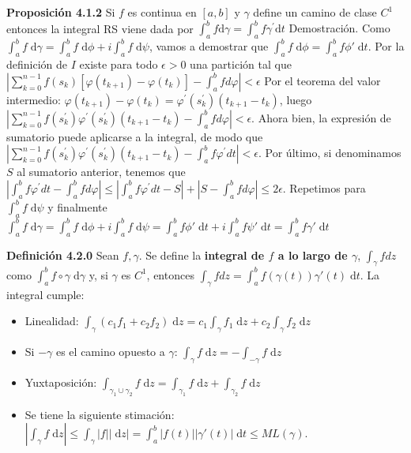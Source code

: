 \documentclass[a4paper, 11pt]{extarticle}
\newcommand{\propo}[1]{\textcolor{rojo}{\textbf{Proposición #1}}}
\newcommand{\defi}[1]{\textcolor{azul}{\textbf{Definición #1}}}
\newcommand{\dem}[1]{\textcolor{gris}{\small{Demostración. #1}}}
\begin{document}
\begin{multicols*}{2}
\propo{4.1.2} Si \(f\) es continua en \([a, b]\) y \(\gamma\) define un
camino de clase \(C^1\) entonces la integral RS viene dada por 
\(\int_{a}^{b} f \text{d} \gamma=\int_{a}^{b} f \gamma^{\prime} \text{d} t\)
\dem{ Como \( \int_ { a }^{ b } f \;
 \text{d}\gamma 
 = \int_ { a }^{ b } f \; \text{d}\phi + i \int_ { a }^{ b } f \; \text{d}\psi   \), vamos a demostrar que 
\( \int_ { a }^{ b } f \; \text{d}\phi = \int_ { a }^{ b } f \phi'\; \text{d}t \).
Por la definición de \( I \) existe para todo \( \epsilon > 0 \) una partición tal que \( 
 \left|\sum_{k=0}^{n-1} f\left(s_{k}\right)\left[\varphi\left(t_{k+1}\right)-\varphi\left(t_{k}\right)\right]-\int_{a}^{b} f d \varphi\right|<\epsilon \) 
Por el teorema del valor intermedio: \( \varphi\left(t_{k+1}\right)-\varphi\left(t_{k}\right)=\varphi^{\prime}\left(s_{k}^{\prime}\right)\left(t_{k+1}-t_{k}\right) \),
luego \(  |\sum_{k=0}^{n-1} f\left(s_{k}^{\prime}\right) \varphi^{\prime}\left(s_{k}^{\prime}\right)\left(t_{k+1}-t_{k}\right)-\int_{a}^{b} f d \varphi|<\epsilon\).
Ahora bien, la expresión de sumatorio puede aplicarse a la integral, de modo que 
\(|\sum_{k=0}^{n-1} f\left(s_{k}^{\prime}\right) \varphi^{\prime}\left(s_{k}^{\prime}\right)\left(t_{k+1}-t_{k}\right)-\int_{a}^{b} f \varphi^{\prime} d t|<\epsilon \).
Por último, si denominamos \( S \) al sumatorio anterior, tenemos que \( |\int_{a}^{b} f \varphi^{\prime} d t - 
\int_{a}^{b} f d \varphi | \le |\int_{a}^{b} f \varphi^{\prime} d t - S| + | S - \int_{a}^{b} f d \varphi | \le 2 \epsilon \). 
Repetimos para \( \int_ { a }^{ b } f \; \text{d}\psi  \) y finalmente 
\(  \int_ { a }^{ b } f \; \text{d}\gamma =  \int_ { a }^{ b } f \; \text{d}\phi + i  \int_ { a }^{ b } f \; \text{d}\psi 
=  \int_ { a }^{ b } f\phi' \; \text{d}t + i  \int_ { a }^{ b } f\psi' \; \text{d}t =  
\int_ { a }^{ b } f\gamma' \; \text{d}t \)}

\defi{4.2.0} Sean \(f, \gamma\). Se define la \textbf{integral de \(f\) a lo largo
de \(\gamma\)}, \(\int_\gamma fdz\) como \(\int_ { a }^{ b } f \circ \gamma
\; \text{d}\gamma\) y, si \(\gamma\) es \(C^1\), entonces \(\int_\gamma
fdz = \int_ { a }^{ b } f(\gamma(t))\gamma'(t)  \; \text{d} t\).
La integral cumple:
\begin{itemize}
\item Linealidad: \(\int _\gamma (c_1f_1 + c_2f_2) \; \text{d}z  = c_1 \int _\gamma
  f_1\; \text{d} z + c_2 \int _\gamma f_2 \; \text{d}z\)
\item Si \(-\gamma\) es el camino opuesto a \(\gamma\): \(\int _\gamma f \;
  \text{d}z = - \int _{-\gamma} f \; \text{d}z\)
\item Yuxtaposición: \(\int _{\gamma_1 \cup \gamma_2} f \; \text{d}z = \int
  _{\gamma_1} f \; \text{d}z  + \int _{\gamma_2} f \; \text{d}z\)
\item Se tiene la siguiente stimación: \(|\int _\gamma f \; \text{d}z| \le \int _\gamma |f|| \; \text{d}z|  = \int_ { a
  }^{ b } |f(t)||\gamma'(t)| \; \text{d}t  \le ML(\gamma)\).
\end{itemize}


\end{multicols*}
\end{document}

